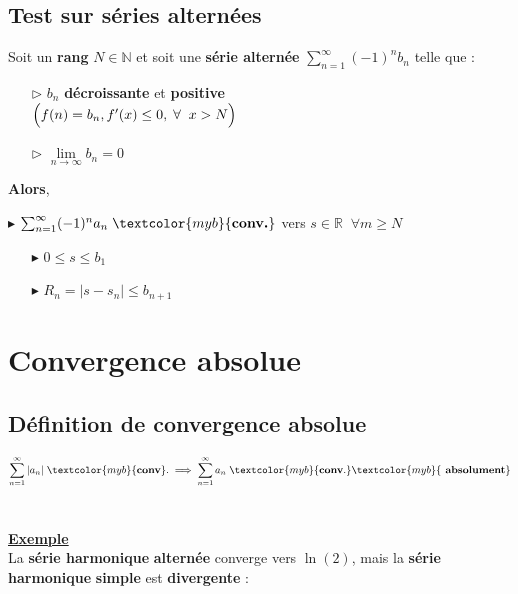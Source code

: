 \documentclass{report}
\begin{document}
\begin{multicols*}{3}
     \section{Test sur séries alternées}
     Soit un \textbf{rang} $N \in \mathbb{N}$ et 
     soit une \textbf{série alternée} 
     $\sum_{n=1}^{\infty } (-1)^nb_n$ telle que :
     \begin{itemize}
       \item [$\rhd$ ]  $b_n$ \textbf{décroissante}  et \textbf{positive} \\
           $\Bigl(f(n) = b_n, f^{\prime}(x) \leq 0, \; \forall \;\; x > N\Bigr)$
       \item [$\rhd$ ] $\lim\limits_{n\to\infty }b_n = 0$ 
     \end{itemize}
     
     \textbf{Alors}, 

    \noindent
    $\blacktriangleright$
    $\sum_{n=1}^{\infty }  (-1)^{n}a_n \; \textcolor{myb}{\textbf{conv.}}$ vers $s \in
    \mathbb{R} \;\; \forall m \geq N $ 

     \begin{itemize}
    \item[$\blacktriangleright$]
    $0 \leq s \leq b_1$ 
        \item[$\blacktriangleright$] 
    $R_n = |s - s_n | \leq b_{n+1}$
     \end{itemize}
\vspace{-3.5em}
\chapter{Convergence absolue}
    \section{Définition de convergence absolue}
    \vspace{-2em}
     \[%
        \sum_{n=1}^{\infty }|a_n| \; \textcolor{myb}{\textbf{conv}}.  \implies 
        \sum_{n=1}^{\infty }a_n \; \textcolor{myb}{\textbf{conv}.} 
        \textcolor{myb}{\textbf{ absolument}}  
     \]%
    \\
     
    \vspace{1em}
    \noindent 
    \underline{\textbf{Exemple}} 
    \vspace{1em}\\
    La \textbf{série harmonique} \textcolor{myb}{\textbf{alternée}} converge 
    vers $\ln(2)$, mais la \textbf{série harmonique} 
    \textcolor{myr}{\textbf{simple}} est \textcolor{myr}{\textbf{divergente}} :  



\end{multicols*}
\end{document}
